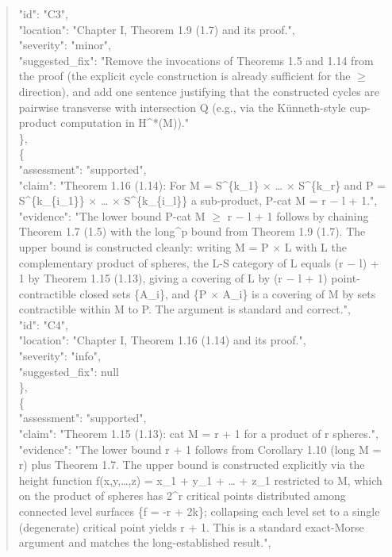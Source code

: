 \documentclass[11pt]{article}
\begin{document}
\begin{quote}
      "id": "C3",\\
      "location": "Chapter I, Theorem 1.9 (1.7) and its proof.",\\
      "severity": "minor",\\
      "suggested\_fix": "Remove the invocations of Theorems 1.5 and 1.14 from the proof (the explicit cycle construction is already sufficient for the \ensuremath{\ge} direction), and add one sentence justifying that the constructed cycles are pairwise transverse with intersection Q (e.g., via the Künneth-style cup-product computation in H\^{}*(M))."\\
    \},\\
    \{\\
      "assessment": "supported",\\
      "claim": "Theorem 1.16 (1.14): For M = S\^{}\{k\_1\} \ensuremath{\times} … \ensuremath{\times} S\^{}\{k\_r\} and P = S\^{}\{k\_\{i\_1\}\} \ensuremath{\times} … \ensuremath{\times} S\^{}\{k\_\{i\_l\}\} a sub-product, P-cat M = r \ensuremath{-} l + 1.",\\
      "evidence": "The lower bound P-cat M \ensuremath{\ge} r \ensuremath{-} l + 1 follows by chaining Theorem 1.7 (1.5) with the long\^{}p bound from Theorem 1.9 (1.7). The upper bound is constructed cleanly: writing M = P \ensuremath{\times} L with L the complementary product of spheres, the L-S category of L equals (r \ensuremath{-} l) + 1 by Theorem 1.15 (1.13), giving a covering of L by (r \ensuremath{-} l + 1) point-contractible closed sets \{A\_i\}, and \{P \ensuremath{\times} A\_i\} is a covering of M by sets contractible within M to P. The argument is standard and correct.",\\
      "id": "C4",\\
      "location": "Chapter I, Theorem 1.16 (1.14) and its proof.",\\
      "severity": "info",\\
      "suggested\_fix": null\\
    \},\\
    \{\\
      "assessment": "supported",\\
      "claim": "Theorem 1.15 (1.13): cat M = r + 1 for a product of r spheres.",\\
      "evidence": "The lower bound r + 1 follows from Corollary 1.10 (long M = r) plus Theorem 1.7. The upper bound is constructed explicitly via the height function f(x,y,…,z) = x\_1 + y\_1 + … + z\_1 restricted to M, which on the product of spheres has 2\^{}r critical points distributed among connected level surfaces \{f = -r + 2k\}; collapsing each level set to a single (degenerate) critical point yields r + 1. This is a standard exact-Morse argument and matches the long-established result.",\\

\end{quote}
\end{document}
